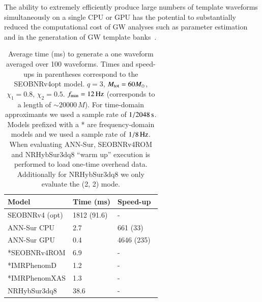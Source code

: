 \documentclass[aps,prd,reprint,superscriptaddress,preprintnumbers,showpacs,nofootinbib]{revtex4-1}
\begin{document}
The ability to extremely efficiently produce large numbers of template waveforms
simultaneously on a single CPU or GPU has the potential to substantially reduced
the computational cost of GW analyses such as parameter
estimation~\cite{Pankow2015NovelSF,Lange2018RapidAA} and in the generatation of
GW template banks~\cite{Harry2016SearchingFG,Roy2019EffectualGT}.

\begin{table}
\begin{tabular}{lll}
\hline
Model & Time (ms) & Speed-up \\ \hline
SEOBNRv4 (opt) & 1812 (91.6)  & -  \\
ANN-Sur CPU & 2.7 & 661 (33) \\
ANN-Sur GPU & 0.4 & 4646 (235) \\ \hline
*SEOBNRv4ROM & 6.9 & - \\
*IMRPhenomD & 1.2 & - \\
*IMRPhenomXAS & 1.3 & - \\
NRHybSur3dq8 & 38.6 & - \\
\hline
\end{tabular}
\caption{Average time (ms) to generate a one waveform averaged over 100
waveforms. Times and speed-ups in parentheses correspond to the SEOBNRv4opt
model. $q=3$, $M_{\rm{tot}}=60 M_\odot$, $\chi_{1} = 0.8$, $\chi_{2} = 0.5$.
$f_{\rm{min}} = 12 \, {\rm{Hz}}$ (corresponds to a length of $\sim 20000 \, M$).
For time-domain approximants we used a sample rate of $1/2048 \, {\rm{s}}$.
Models prefixed with a * are frequency-domain models and we used a sample rate
of $1/8 \, {\rm{Hz}}$. When evaluating ANN-Sur, SEOBNRv4ROM and NRHybSur3dq8 ``warm up'' execution is performed to load one-time overhead data.
Additionally for NRHybSur3dq8 we only evaluate the (2, 2) mode.}
\label{tab:speed-comparison}
\end{table}
\end{document}
